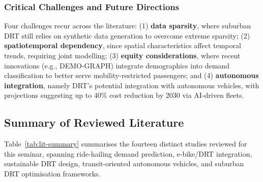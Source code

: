 \documentclass[12pt]{article}
\begin{document}
\subsubsection{Critical Challenges and Future Directions}
Four challenges recur across the literature: (1) \textbf{data sparsity}, where suburban
DRT still relies on synthetic data generation to overcome extreme sparsity;
(2) \textbf{spatiotemporal dependency}, since spatial characteristics affect temporal
trends, requiring joint modelling; (3) \textbf{equity considerations}, where recent
innovations (e.g., DEMO-GRAPH) integrate demographics into demand classification to
better serve mobility-restricted passengers; and (4) \textbf{autonomous
integration}, namely DRT's potential integration with autonomous vehicles, with
projections suggesting up to 40\% cost reduction by 2030 via AI-driven fleets.

\subsection{Summary of Reviewed Literature}

Table~\ref{tab:lit-summary} summarises the fourteen distinct studies reviewed for
this seminar, spanning ride-hailing demand prediction, e-bike/DRT integration,
sustainable DRT design, transit-oriented autonomous vehicles, and suburban DRT
optimisation frameworks.
\end{document}
